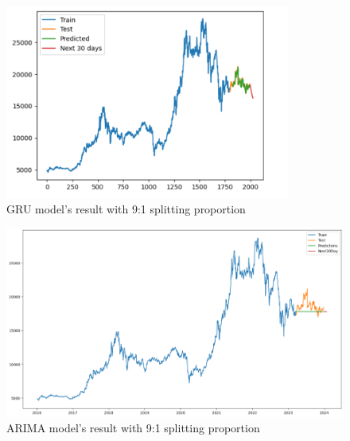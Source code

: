 \documentclass{ieeeojies}
\begin{document}
\begin{figure}[H]
  \centering
  \begin{minipage}{0.8\linewidth}
    \centering
    \includegraphics[width=\linewidth]{bibliography/GRU_MBB91.png}
    \caption{GRU model's result with 9:1 splitting proportion}
    \label{fig17}
  \end{minipage}
\end{figure}
\begin{figure}[H]
  \centering
  \begin{minipage}{0.8\linewidth}
    \centering
    \includegraphics[width=\linewidth]{bibliography/ARIMA_MBB91.png}
    \caption{ARIMA model's result with 9:1 splitting proportion}
    \label{fig18}
  \end{minipage}
\end{figure}
\end{document}
